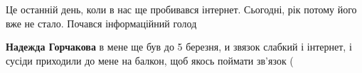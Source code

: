  
 
 
 
 

\qqSecCmt


Це останній день, коли в нас ще пробивався інтернет. Сьогодні, рік потому його
вже не стало. Почався інформаційний голод

\begin{itemize} %
\textbf{Надежда Горчакова} в мене ще був до 5 березня, и звязок слабкий і інтернет, і сусіди приходили до мене на балкон, щоб якось поймати зв'язок (
\end{itemize} %


🙏🏻
